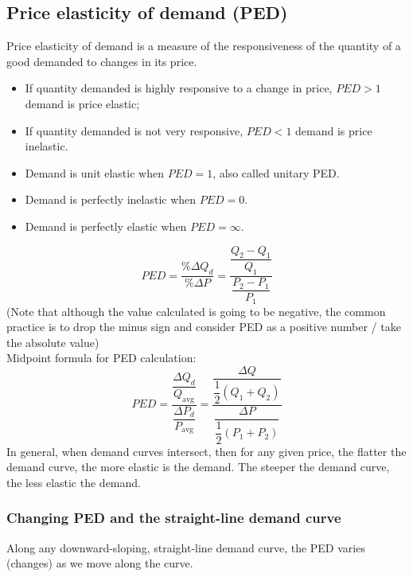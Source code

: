 \documentclass[a4paper,12pt]{article}
\begin{document}
\subsection{Price elasticity of demand (PED)}
Price elasticity of demand is a measure of the responsiveness of the quantity of a good demanded to changes in its price.
\begin{itemize}
  \item If quantity demanded is highly responsive to a change in price, $PED>1$ demand is price elastic; 
  \item If quantity demanded is not very responsive, $PED<1$ demand is price inelastic.
  \item Demand is unit elastic when $PED=1$, also called unitary PED.
  \item Demand is perfectly inelastic when $PED=0$.
  \item Demand is perfectly elastic when $PED=\infty$.
\end{itemize}
\[PED=\dfrac{\%\Delta Q_d}{\%\Delta P}=\dfrac{\dfrac{Q_2-Q_1}{Q_1}}{\dfrac{P_2-P_1}{P_1}}\]
(Note that although the value calculated is going to be negative, the common practice is to drop the minus sign and consider PED as a positive number / take the absolute value)\\
Midpoint formula for PED calculation:
\[PED=\dfrac{\dfrac{\Delta Q_d}{Q_\text{avg}}}{\dfrac{\Delta P_d}{P_\text{avg}}}=\dfrac{\dfrac{\Delta Q}{\dfrac{1}{2}(Q_1+Q_2)}}{\dfrac{\Delta P}{\dfrac{1}{2}(P_1+P_2)}}\]
In general, when demand curves intersect, then for any given price, the flatter the demand curve, the more elastic is the demand. The steeper the demand curve, the less elastic the demand.
\subsubsection*{Changing PED and the straight-line demand curve}
Along any downward-sloping, straight-line demand curve, the PED varies (changes) as we move along the curve.
\end{document}
